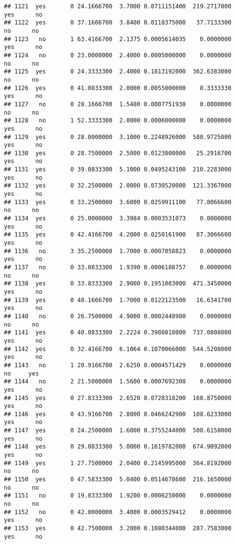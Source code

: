\documentclass[]{article}
\begin{document}
\begin{verbatim}
## 1121  yes       0 24.1666700  3.7000 0.0711151400  219.2717000   yes      no
## 1122  yes       0 37.1666700  3.8400 0.0118375000   37.7133300    no      no
## 1123   no       1 63.4166700  2.1375 0.0005614035    0.0000000   yes      no
## 1124   no       0 23.0000000  2.4000 0.0005000000    0.0000000    no      no
## 1125  yes       0 24.3333300  2.4000 0.1813192000  362.6383000    no      no
## 1126  yes       0 41.0833300  2.0000 0.0055000000    8.3333330   yes      no
## 1127   no       0 28.1666700  1.5480 0.0007751938    0.0000000    no      no
## 1128   no       1 52.3333300  2.0000 0.0006000000    0.0000000   yes      no
## 1129  yes       0 28.0000000  3.1000 0.2248926000  580.9725000   yes      no
## 1130  yes       0 28.7500000  2.5000 0.0123800000   25.2916700   yes      no
## 1131  yes       0 39.0833300  5.1000 0.0495243100  210.2283000   yes      no
## 1132  yes       0 32.2500000  2.0000 0.0730520000  121.3367000   yes      no
## 1133  yes       0 33.2500000  3.6000 0.0259911100   77.8066600    no      no
## 1134  yes       0 25.0000000  3.3984 0.0003531073    0.0000000   yes      no
## 1135  yes       0 42.4166700  4.2000 0.0250161900   87.3066600   yes      no
## 1136   no       3 35.2500000  1.7000 0.0007058823    0.0000000   yes      no
## 1137   no       0 33.0833300  1.9390 0.0006188757    0.0000000    no      no
## 1138  yes       0 33.8333300  2.9000 0.1951083000  471.3450000   yes      no
## 1139  yes       0 48.1666700  1.7000 0.0122123500   16.6341700   yes      no
## 1140   no       0 26.7500000  4.9000 0.0002448980    0.0000000    no      no
## 1141  yes       0 40.0833300  2.2224 0.3980818000  737.0808000   yes      no
## 1142  yes       0 32.4166700  6.1064 0.1070066000  544.5208000   yes      no
## 1143   no       1 20.9166700  2.6250 0.0004571429    0.0000000    no     yes
## 1144   no       2 21.5000000  1.5600 0.0007692308    0.0000000   yes      no
## 1145  yes       0 27.8333300  2.6520 0.0728318200  160.8750000   yes      no
## 1146  yes       0 43.9166700  2.8000 0.0466242900  108.6233000   yes      no
## 1147  yes       0 24.2500000  1.6000 0.3755244000  500.6158000   yes      no
## 1148  yes       0 29.0833300  5.0000 0.1619782000  674.9092000   yes      no
## 1149  yes       1 27.7500000  2.0400 0.2145995000  364.8192000    no      no
## 1150  yes       0 47.5833300  5.0400 0.0514678600  216.1650000    no      no
## 1151   no       0 19.8333300  1.9200 0.0006250000    0.0000000    no      no
## 1152   no       0 42.0000000  3.4000 0.0003529412    0.0000000   yes      no
## 1153  yes       0 42.7500000  3.2000 0.1080344000  287.7583000   yes      no

\end{verbatim}
\end{document}
